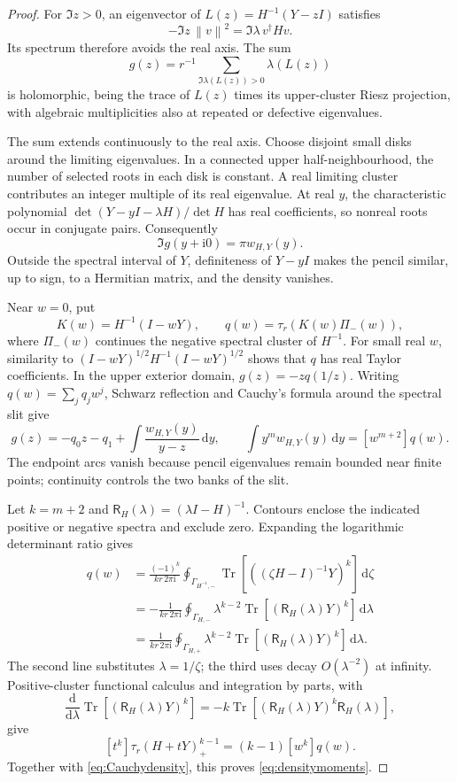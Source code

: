 \documentclass[11pt]{amsart}
\theoremstyle{remark}
\theoremstyle{plain}
\numberwithin{equation}{section}
\DeclareMathOperator{\Tr}{Tr}
\newcommand{\ii}{\mathrm i}
\newcommand{\dd}{\,\mathrm d}
\newcommand{\norm}[1]{\left\|#1\right\|}
\begin{document}
\begin{proof}
For \(\Im z>0\), an eigenvector of \(L(z)=H^{-1}(Y-zI)\) satisfies
\[
 -\Im z\,\norm v^2=\Im\lambda\,v^\dagger Hv.
\]
Its spectrum therefore avoids the real axis. The sum
\[
 g(z)=r^{-1}\sum_{\Im\lambda(L(z))>0}\lambda(L(z))
\]
is holomorphic, being the trace of \(L(z)\) times its upper-cluster
Riesz projection, with algebraic multiplicities also at repeated or
defective eigenvalues.

The sum extends continuously to the real axis. Choose disjoint small
disks around the limiting eigenvalues. In a connected upper
half-neighbourhood, the number of selected roots in each disk is
constant. A real limiting cluster contributes an integer multiple
of its real eigenvalue. At real \(y\), the characteristic polynomial
\(\det(Y-yI-\lambda H)/\det H\) has real coefficients, so nonreal
roots occur in conjugate pairs. Consequently
\[
 \Im g(y+\ii0)=\pi w_{H,Y}(y).
\]
Outside the spectral interval of \(Y\), definiteness of \(Y-yI\)
makes the pencil similar, up to sign, to a Hermitian matrix, and
the density vanishes.

Near \(w=0\), put
\[
 K(w)=H^{-1}(I-wY),\qquad
 q(w)=\tau_r(K(w)\Pi_-(w)),
\]
where \(\Pi_-(w)\) continues the negative spectral cluster of \(H^{-1}\).
For small real \(w\), similarity to
\((I-wY)^{1/2}H^{-1}(I-wY)^{1/2}\) shows that \(q\) has real Taylor
coefficients. In the upper exterior domain, \(g(z)=-zq(1/z)\).
Writing \(q(w)=\sum_jq_jw^j\), Schwarz reflection and Cauchy's formula
around the spectral slit give
\begin{equation}\label{eq:Cauchydensity}
 g(z)=-q_0z-q_1+\int\frac{w_{H,Y}(y)}{y-z}\dd y,\qquad
 \int y^m w_{H,Y}(y)\dd y=[w^{m+2}]q(w).
\end{equation}
The endpoint arcs vanish because pencil eigenvalues remain bounded
near finite points; continuity controls the two banks of the slit.

Let \(k=m+2\) and \(\mathsf R_H(\lambda)=(\lambda I-H)^{-1}\).
Contours enclose the indicated positive or negative spectra and
exclude zero. Expanding the logarithmic determinant ratio gives
\begin{align*}
 [w^k]q(w)
 &=\frac{(-1)^k}{kr\,2\pi\ii}
   \oint_{\Gamma_{H^{-1},-}}
   \Tr[((\zeta H-I)^{-1}Y)^k]\dd\zeta\\
 &=-\frac1{kr\,2\pi\ii}
   \oint_{\Gamma_{H,-}}
   \lambda^{k-2}\Tr[(\mathsf R_H(\lambda)Y)^k]\dd\lambda\\
 &=\frac1{kr\,2\pi\ii}
   \oint_{\Gamma_{H,+}}
   \lambda^{k-2}\Tr[(\mathsf R_H(\lambda)Y)^k]\dd\lambda.
\end{align*}
The second line substitutes \(\lambda=1/\zeta\); the third uses
decay \(O(\lambda^{-2})\) at infinity.
Positive-cluster functional calculus and integration by parts, with
\[
 \frac{\mathrm d}{\mathrm d\lambda}
 \Tr[(\mathsf R_H(\lambda)Y)^k]
 =-k\Tr[(\mathsf R_H(\lambda)Y)^k\mathsf R_H(\lambda)],
\]
give
\[
 [t^k]\tau_r(H+tY)_+^{k-1}=(k-1)[w^k]q(w).
\]
Together with \eqref{eq:Cauchydensity}, this proves
\eqref{eq:densitymoments}.


\end{proof}
\end{document}

